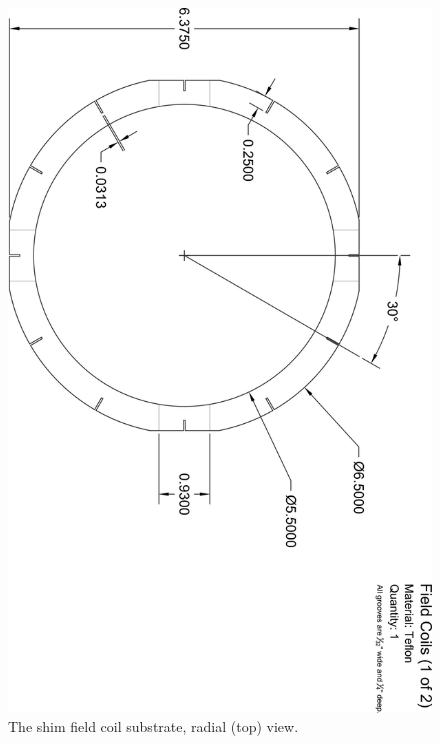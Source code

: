 \documentclass[../PaulGanssle-Thesis.tex]{subfiles}
\begin{document}
\begin{figure}[p]
\centering
\includegraphics[height=0.95\textheight]{appendices/blueprints/ShimCoils01-Radial.png}
\caption{The shim field coil substrate, radial (top) view.}
\label{blueprints:FieldCoils-Radial}
\end{figure}
\end{document}
